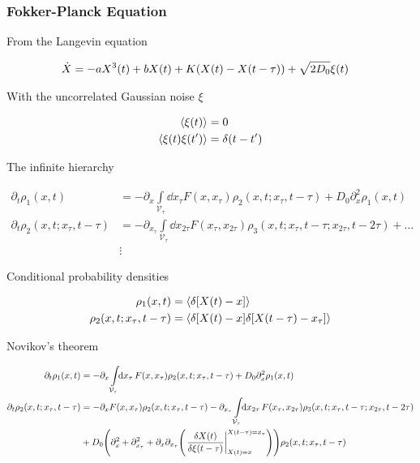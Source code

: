 \documentclass[a4paper,10pt]{article}
\newcommand{\intl}{\int\limits}
\begin{document}
\subsubsection*{Fokker-Planck Equation}

From the Langevin equation

\begin{align}
	\dot{X}
	&=
	-
	a
	X^3(t)
	+
	b
	X(t)
	+
	K
	\pqty{X(t)-X(t-\tau)}
	+
	\sqrt{2D_0}
	\xi(t)
\end{align} 

With the uncorrelated Gaussian noise $\xi$

\begin{align}
	\expval{\xi(t)}
	&=
	0
\\
	\expval{
		\xi(t)
		\xi(t^\prime)
	}
	&=
	\delta(t-t^\prime)
\end{align}

The infinite hierarchy

\begin{align}
	\partial_t
	\rho_1(x,t)
	&=
	-\partial_x
	\intl_{\mathcal{V}_\tau}
	\!\!
	\dd{x_\tau}
	F(x,x_\tau)
	\rho_2
	(x,t;x_\tau,t-\tau)
	+
	D_0
	\partial_x^2
	\rho_1(x,t)
\\
	\partial_t
	\rho_2(x,t;x_\tau,t-\tau)
	&=
	-\partial_{x_\tau}
	\intl_{\mathcal{V}_\tau}
	\!\!
	\dd{x_{2\tau}}
	F(x_\tau,x_{2\tau})
	\rho_3
	(x,t;x_\tau,t-\tau;x_{2\tau},t-2\tau)
	+
	\ldots
\\
	&\vdots
\end{align}

Conditional probability densities

\begin{align}
	\rho_1(x,t)
	&=
	\expval{\delta\bqty{X(t)-x}}
\\
	\rho_2(x,t;x_\tau,t-\tau)
	&=
	\expval{
		\delta\bqty{X(t)-x}
		\delta\bqty{X(t-\tau)-x_\tau}
	}
\end{align}

Novikov's theorem

\begin{align}
	\partial_t
	\rho_1(x,t)
	&=
	-\partial_x
	\intl_{\mathcal{V}_\tau}
	\!\!
	\dd{x_\tau}
	F(x,x_\tau)
	\rho_2
	(x,t;x_\tau,t-\tau)
	+
	D_0
	\partial_x^2
	\rho_1(x,t)
\\
	\partial_t
	\rho_2(x,t;x_\tau,t-\tau)
	&=
	-
	\partial_{x}
	F(x,x_\tau)
	\rho_2(x,t;x_\tau,t-\tau)
	-
	\partial_{x_\tau}
	\intl_{\mathcal{V}_\tau}
	\!\!
	\dd{x_{2\tau}}
	F(x_\tau,x_{2\tau})
	\rho_3
	(x,t;x_\tau,t-\tau;x_{2\tau},t-2\tau)
\\
	&+
	D_0
	\pqty{
		\partial_x^2
		+
		\partial_{x_\tau}^2
		+
		\partial_x
		\partial_{x_\tau}
		\pqty{
			\eval{\frac{\delta X(t)}{\delta\xi(t-\tau)}}_{
				X(t)=x
			}^{X(t-\tau)=x_{\tau}}
		}
	}
	\rho_2(x,t;x_\tau,t-\tau)
\end{align}
\end{document}
